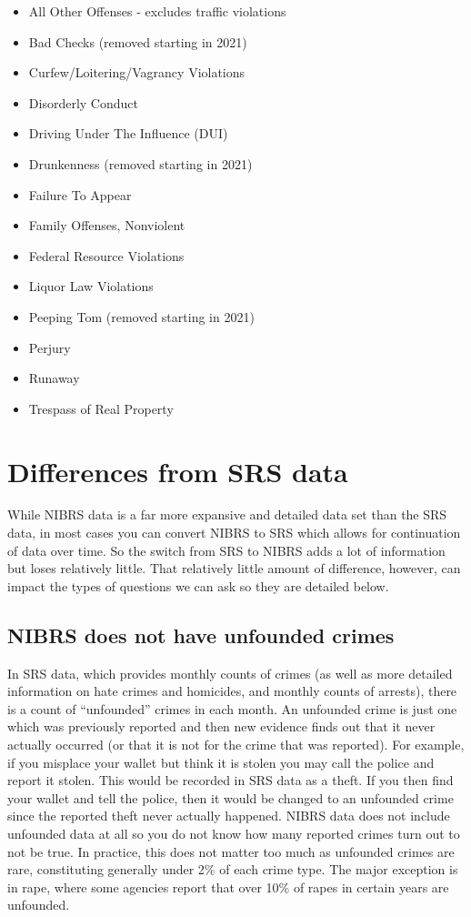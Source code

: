 \documentclass[
]{krantz}
\providecommand{\tightlist}{%
  \setlength{\itemsep}{0pt}\setlength{\parskip}{0pt}}
\begin{document}
\begin{itemize}
\tightlist
\item
  All Other Offenses - excludes traffic violations
\item
  Bad Checks (removed starting in 2021)
\item
  Curfew/Loitering/Vagrancy Violations
\item
  Disorderly Conduct
\item
  Driving Under The Influence (DUI)
\item
  Drunkenness (removed starting in 2021)
\item
  Failure To Appear
\item
  Family Offenses, Nonviolent
\item
  Federal Resource Violations
\item
  Liquor Law Violations
\item
  Peeping Tom (removed starting in 2021)
\item
  Perjury
\item
  Runaway
\item
  Trespass of Real Property
\end{itemize}

\section{Differences from SRS
data}\label{differences-from-srs-data}

While NIBRS data is a far more expansive and detailed
data set than the SRS data, in most cases you can convert
NIBRS to SRS which allows for continuation of data over
time. So the switch from SRS to NIBRS adds a lot of
information but loses relatively little. That relatively
little amount of difference, however, can impact the types
of questions we can ask so they are detailed below.

\subsection{NIBRS does not have unfounded
crimes}\label{nibrs-does-not-have-unfounded-crimes}

In SRS data, which provides monthly counts of crimes (as
well as more detailed information on hate crimes and
homicides, and monthly counts of arrests), there is a count
of ``unfounded'' crimes in each month. An unfounded crime is
just one which was previously reported and then new evidence
finds out that it never actually occurred (or that it is not
for the crime that was reported). For example, if you
misplace your wallet but think it is stolen you may call the
police and report it stolen. This would be recorded in SRS
data as a theft. If you then find your wallet and tell the
police, then it would be changed to an unfounded crime since
the reported theft never actually happened. NIBRS data does
not include unfounded data at all so you do not know how
many reported crimes turn out to not be true. In practice,
this does not matter too much as unfounded crimes are rare,
constituting generally under 2\% of each crime type. The
major exception is in rape, where some agencies report that
over 10\% of rapes in certain years are unfounded.
\end{document}
